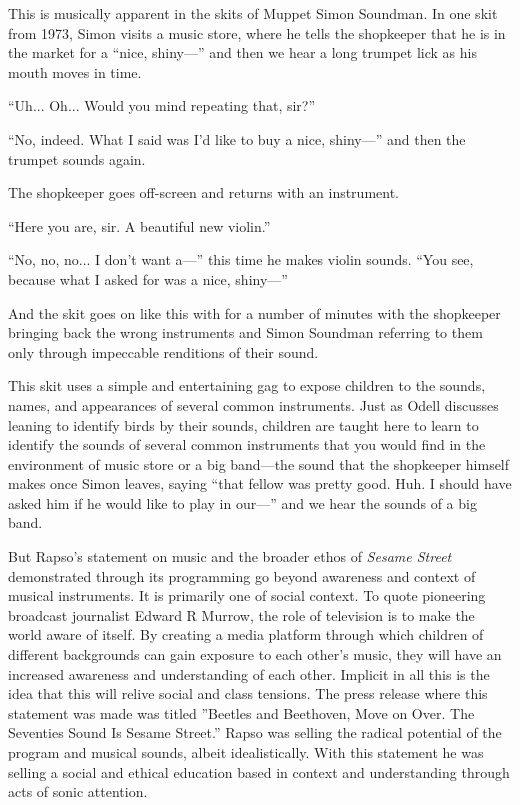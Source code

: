 \documentclass[12pt,letterpaper]{article}
\newcommand{\ses}{\textit{Sesame Street }}
\begin{document}
	This is musically apparent in the skits of Muppet Simon Soundman.
	In one skit from 1973,\autocite{0458} Simon visits a music store, where
	he tells the shopkeeper
	that he is in the market for a ``nice, shiny---'' and then we hear a
	long trumpet lick as his mouth moves in time. 

	``Uh... Oh... Would you mind repeating that, sir?''

	``No, indeed. What I said was I'd like to buy a nice, shiny---'' and
	then the trumpet sounds again. 

	The shopkeeper goes off-screen and returns with an instrument. 
	 
	``Here you are, sir. A beautiful new violin.''

	``No, no, no... I don't want a---'' this time he makes violin
	sounds.  ``You see, because what I asked for was a nice, shiny---''
	
	And the skit goes on like this with for a number of minutes with the 
	shopkeeper bringing back the wrong instruments and Simon Soundman
	referring to them only through impeccable renditions of their sound. 
	
	This skit uses a simple and entertaining gag to expose children to the
	sounds, names, and appearances of several common instruments. Just as 
	Odell
	discusses leaning to identify birds by their sounds, children are	
	taught here to learn to identify the sounds of several common 
	instruments that you would find in the environment of music store or 
	a big band---the sound that the shopkeeper himself makes once Simon
	leaves, saying ``that fellow was pretty good. Huh. I should have asked
	him if he would like to play in our---'' and we hear the sounds of a
	big band.  

	But Rapso's statement on music and the broader ethos of \ses 
	demonstrated through its programming go beyond awareness and context of 
	musical instruments. It is primarily one of social context. To quote 
	pioneering broadcast journalist Edward R Murrow,
	the role of television is to make the world aware of
	itself.\autocite[49]{Davis} By creating a media platform through which 
	children of different backgrounds can gain exposure to each other's 
	music, they
	will have an increased awareness and understanding of each other.
	Implicit in all this is the idea that this will relive social and class
	tensions. The press release where this statement was made was titled 
	''Beetles and Beethoven, Move on Over. The Seventies Sound Is Sesame 
	Street.'' Rapso was selling the radical potential of the program and
	musical sounds, albeit idealistically. With this statement he was 
	selling a social and ethical education based in context and 
	understanding through acts of sonic attention. 
\end{document}
